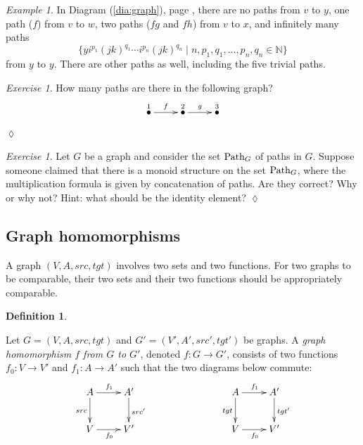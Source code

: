 \documentclass{book}
\def\tn{\textnormal}
\def\NN{{\mathbb N}}
\def\Path{\tn{Path}}
\def\to{\rightarrow}
\def\taking{\colon}
\newcommand{\LMO}[1]{\stackrel{#1}{\bullet}}
\theoremstyle{remark}
\newtheorem{example}[subsubsection]{Example}
\newtheorem{exc}[subsubsection]{Exercise}
\newenvironment{exercise}{\begin{exc}}{\hspace*{\fill}$\lozenge$\end{exc}}
\theoremstyle{definition}
\newtheorem{definition}[subsubsection]{Definition}
\begin{document}
\begin{example}

In Diagram (\ref{dia:graph}), page \pageref{dia:graph}, there are no paths from $v$ to $y$, one path ($f$) from $v$ to $w$, two paths ($fg$ and $fh$) from $v$ to $x$, and infinitely many paths $$\{y i^{p_1}(jk)^{q_1}\cdots i^{p_n}(jk)^{q_n}\;|\;n,p_1,q_1,\ldots,p_n,q_n\in\NN\}$$ from $y$ to $y$. There are other paths as well, including the five trivial paths.

\end{example}

\begin{exercise}
How many paths are there in the following graph? 
$$\xymatrix{\LMO{1}\ar[r]^{f}&\LMO{2}\ar[r]^{g}&\LMO{3}}$$
\end{exercise}

\begin{exercise}
Let $G$ be a graph and consider the set $\Path_G$ of paths in $G$. Suppose someone claimed that there is a monoid structure on the set $\Path_G$, where the multiplication formula is given by concatenation of paths. Are they correct? Why or why not? Hint: what should be the identity element?
\end{exercise}



\subsection{Graph homomorphisms}

A graph $(V,A,src,tgt)$ involves two sets and two functions. For two graphs to be comparable, their two sets and their two functions should be appropriately comparable.

\begin{definition}\label{def:graph homomorphism}

Let $G=(V,A,src,tgt)$ and $G'=(V',A',src',tgt')$ be graphs. A {\em graph homomorphism $f$ from $G$ to $G'$}, denoted $f\taking G\to G'$, consists of two functions $f_0\taking V\to V'$ and $f_1\taking A\to A'$ such that the two diagrams below commute:
\begin{align}\label{dia:graph hom}
\xymatrix{A\ar[r]^{f_1}\ar[d]_{src}&A'\ar[d]^{src'}\\V\ar[r]_{f_0}&V'
}\hspace{1in}
\xymatrix{A\ar[r]^{f_1}\ar[d]_{tgt}&A'\ar[d]^{tgt'}\\V\ar[r]_{f_0}&V'
}
\end{align}

\end{definition}
\end{document}
